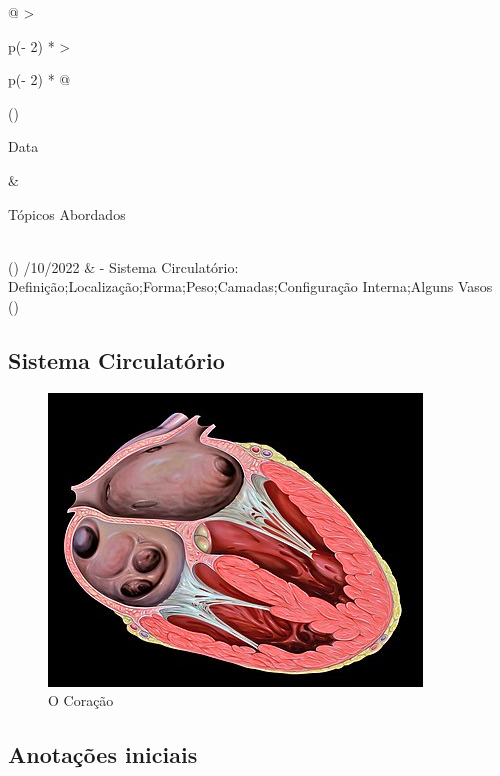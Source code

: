 \documentclass[
]{book}
\begin{document}
\begin{longtable}[]{@{}
  >{\raggedright\arraybackslash}p{(\columnwidth - 2\tabcolsep) * }
  >{\raggedright\arraybackslash}p{(\columnwidth - 2\tabcolsep) * }@{}}
\toprule()
\begin{minipage}[b]{\linewidth}\raggedright
Data
\end{minipage} & \begin{minipage}[b]{\linewidth}\raggedright
Tópicos Abordados
\end{minipage} \\
\midrule()
/10/2022 & - Sistema Circulatório: Definição;Localização;Forma;Peso;Camadas;Configuração Interna;Alguns Vasos \\
\bottomrule()
\end{longtable}

\hypertarget{sistema-circulatuxf3rio}{%
\subsection{Sistema Circulatório}\label{sistema-circulatuxf3rio}}

\begin{figure}

{\centering \includegraphics[width=0.9\linewidth]{figuras/Aula7-1-o-coracao} 

}

\caption{O Coração}\label{fig:unnamed-chunk-14}
\end{figure}

\hypertarget{anotauxe7uxf5es-iniciais-1}{%
\subsection{Anotações iniciais}\label{anotauxe7uxf5es-iniciais-1}}
\end{document}
